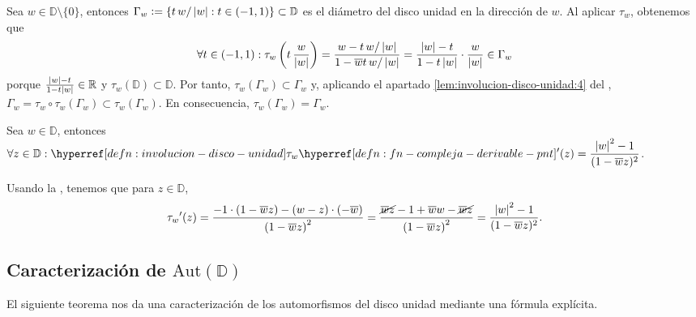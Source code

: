 \begin{obs}\label{obs:involucion-disco-unidad-diametro}
    Sea $w \in \mathbb{D} \setminus \{0\}$, entonces $\Gamma_w \vcentcolon= \left\{t \, w/\left|w\right| : t  \in (-1,1)\right\} \subset \mathbb{D}$ es el diámetro del disco unidad en la dirección de $w$. Al aplicar $\tau_w$, obtenemos que
    \[
    \forall t \in (-1,1) : \tau_w\left(t \, \frac{w}{\left|w\right|}\right) = \frac{w - t \, w/\left|w\right|}{1 - \overline{w} t \, w/\left|w\right|} = \frac{\left|w\right| - t}{1 - t \left|w\right|} \cdot \frac{w}{\left|w\right|} \in \Gamma_w
    \]
    porque $\frac{\left|w\right| - t}{1 - t \left|w\right|} \in \mathbb{R}$ y $\tau_w(\mathbb{D}) \subset \mathbb{D}$. Por tanto, $\tau_w \left(\Gamma_w\right) \subset \Gamma_w$ y, aplicando el apartado \ref{lem:involucion-disco-unidad:4} del , $\Gamma_w = \tau_w \circ \tau_w \left(\Gamma_w\right) \subset \tau_w \left(\Gamma_w\right)$. En consecuencia, $\tau_w \left(\Gamma_w\right) = \Gamma_w$. 
\end{obs}

\begin{lem}\label{lem:involucion-disco-unidad-derivada}
    Sea $w \in \mathbb{D}$, entonces $\ds \forall z \in \mathbb{D} : \exhyperref[defn:involucion-disco-unidad]{involucion-disco-unidad}{\tau_w}\exhyperref[defn:fn-compleja-derivable-pnt]{fn-compleja-derivable-pnt}{'}(z) = \frac{\abs{w}^2 - 1}{(1 - \bar{w} z)^2}$.
\end{lem}
\begin{dem}
    Usando la , tenemos que para $z \in \mathbb{D}$,
    \[
    {\tau_w}'(z) = \frac{-1 \cdot \left(1 - \overline{w} z\right) - (w - z) \cdot (-\overline{w})}{\left(1 - \overline{w} z\right)^2} = \frac{\cancel{\overline{w} z} - 1 + \overline{w} w - \cancel{\overline{w} z}}{\left(1 - \overline{w} z\right)^2} = \frac{\left|w\right|^2 - 1}{(1 - \overline{w} z)^2}.
    \]

    \vspace{-\baselineskip}
    \vspace{-\belowdisplayskip}
    \hfill\qedsymbol
\end{dem}

\subsection{Caracterización de $\mathrm{Aut} \left(\mathbb{D} \right)$}

El siguiente teorema nos da una caracterización de los automorfismos del disco unidad mediante una fórmula explícita.

